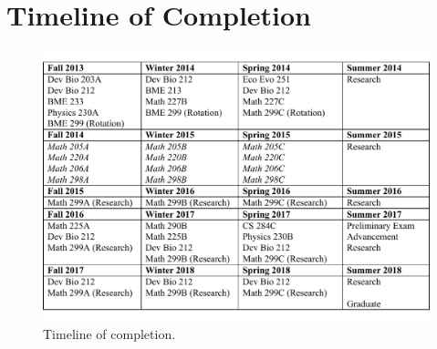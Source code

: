 \chapter{Timeline of Completion}
\begin{figure}[!ht]
   \begin{center}
   \captionsetup{width=0.9\linewidth}
	\includegraphics*[width=0.9\linewidth]{timeline.pdf}
      \caption{Timeline of completion.}
      \label{fig::Timelineofcompletion.}
   \end{center}
\end{figure}